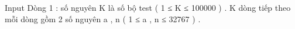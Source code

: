 Input
Dòng 1 : số nguyên K là số bộ test ( 1 ≤ K ≤ 100000 ) . K dòng tiếp theo mỗi dòng gồm 2 số nguyên a , n (  1 ≤ a , n ≤ 32767 ) .